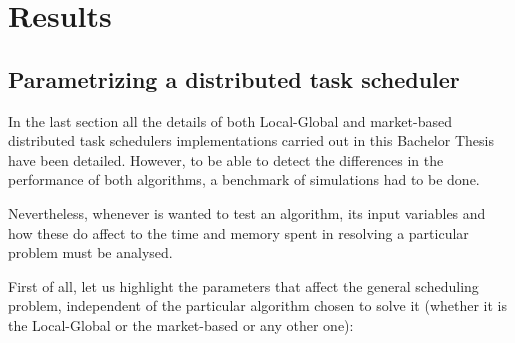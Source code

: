 
\chapter{Results} %

\label{Chapter4} %


\section{Parametrizing a distributed task scheduler}

In the last section all the details of both Local-Global and market-based distributed task schedulers implementations carried out in this Bachelor Thesis have been detailed. However, to be able to detect the differences in the performance of both algorithms, a benchmark of simulations had to be done.

Nevertheless, whenever is wanted to test an algorithm, its input variables and how these do affect to the time and memory spent in resolving a particular problem must be analysed.

First of all, let us highlight the parameters that affect the general scheduling problem, independent of the particular algorithm chosen to solve it (whether it is the Local-Global or the market-based or any other one):

